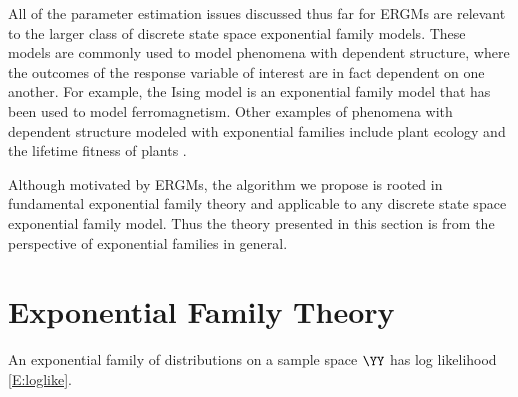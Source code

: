 All of the parameter estimation issues discussed thus far for ERGMs are relevant to 
the larger class of discrete state space exponential family models.
These models are commonly used to model phenomena with dependent structure, 
where the outcomes of the response variable of interest are in fact dependent on one 
another.  For example, the Ising 
model \citep{Ising,Potts} is an exponential family model that has been used to model 
ferromagnetism.  
Other examples of phenomena with dependent structure modeled with exponential 
families include
plant ecology \citep{Besag:1974,Besag:1975} and the lifetime fitness of plants \citep
{Shaw:2008}.

Although motivated by ERGMs, the algorithm we propose is rooted in fundamental
exponential family theory and applicable to any discrete state space 
exponential family model.  Thus the theory presented in this section is from
the perspective of exponential families in general.

\section{Exponential Family Theory}
An exponential family of distributions \citep{Barndorff,Geyer:gdor}
on a sample space $\YY$ has log likelihood \eqref{E:loglike}.

